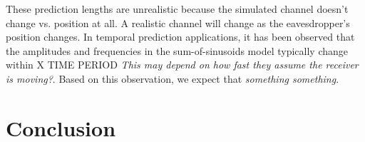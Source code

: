 \documentclass[11pt]{article} %
\begin{document}

These prediction lengths are unrealistic because the simulated channel doesn't change vs. position at all.  A realistic channel will change as the eavesdropper's position changes.  In temporal prediction applications, it has been observed that the amplitudes and frequencies in the sum-of-sinusoids model typically change within X TIME PERIOD \cite{the duel-hallen paper that says that} \emph{This may depend on how fast they assume the receiver is moving?}.  Based on this observation, we expect that \emph{something something}.

\section{Conclusion}

{}
\end{document}
